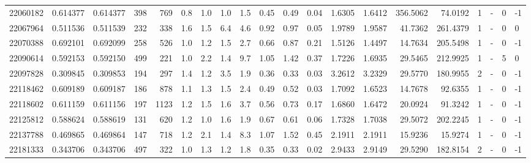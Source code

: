 \begin{tabular}{rrrrrrrrrrrrrrrrrlrl}
  22060182 & 0.614377 &   0.614377 &  398 &  769 &      0.8 &      1.0 &     1.0 &      1.5 &       0.45 &        0.49 &        0.04 &  1.6305 &  1.6412 &  356.5062 &   74.0192 &       1 &             - &        0 &        -1 \\
  22067964 & 0.511536 &   0.511539 &  232 &  338 &      1.6 &      1.5 &     6.4 &      4.6 &       0.92 &        0.97 &        0.05 &  1.9789 &  1.9587 &   41.7362 &  261.4379 &       1 &             - &        0 &         0 \\
  22070388 & 0.692101 &   0.692099 &  258 &  526 &      1.0 &      1.2 &     1.5 &      2.7 &       0.66 &        0.87 &        0.21 &  1.5126 &  1.4497 &   14.7634 &  205.5498 &       1 &             - &        0 &        -1 \\
  22090614 & 0.592153 &   0.592150 &  499 &  221 &      1.0 &      2.2 &     1.4 &      9.7 &       1.05 &        1.42 &        0.37 &  1.7226 &  1.6935 &   29.5465 &  212.9925 &       1 &             - &        5 &         0 \\
  22097828 & 0.309845 &   0.309853 &  194 &  297 &      1.4 &      1.2 &     3.5 &      1.9 &       0.36 &        0.33 &        0.03 &  3.2612 &  3.2329 &   29.5770 &  180.9955 &       2 &             - &        0 &        -1 \\
  22118462 & 0.609189 &   0.609187 &  186 &  878 &      1.1 &      1.3 &     1.5 &      2.4 &       0.49 &        0.52 &        0.03 &  1.7092 &  1.6523 &   14.7678 &   92.6355 &       1 &             - &        0 &        -1 \\
  22118602 & 0.611159 &   0.611156 &  197 & 1123 &      1.2 &      1.5 &     1.6 &      3.7 &       0.56 &        0.73 &        0.17 &  1.6860 &  1.6472 &   20.0924 &   91.3242 &       1 &             - &        0 &        -1 \\
  22125812 & 0.588624 &   0.588619 &  131 &  620 &      1.2 &      1.0 &     1.6 &      1.9 &       0.67 &        0.61 &        0.06 &  1.7328 &  1.7038 &   29.5072 &  202.2245 &       1 &             - &        0 &        -1 \\
  22137788 & 0.469865 &   0.469864 &  147 &  718 &      1.2 &      2.1 &     1.4 &      8.3 &       1.07 &        1.52 &        0.45 &  2.1911 &  2.1911 &   15.9236 &   15.9274 &       1 &             - &        0 &        -1 \\
  22181333 & 0.343706 &   0.343706 &  497 &  322 &      1.0 &      1.3 &     1.2 &      1.8 &       0.35 &        0.33 &        0.02 &  2.9433 &  2.9149 &   29.5290 &  182.8154 &       2 &             - &        0 &        -1 \\

\end{tabular}
